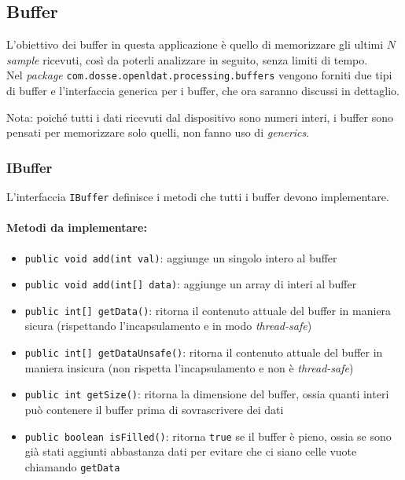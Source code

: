 \subsection{Buffer}
L'obiettivo dei buffer in questa applicazione è quello di memorizzare gli ultimi $N$ \textit{sample} ricevuti, così da poterli analizzare in seguito, senza limiti di tempo.\\
Nel \textit{package} \texttt{com.dosse.openldat.processing.buffers} vengono forniti due tipi di buffer e l'interfaccia generica per i buffer, che ora saranno discussi in dettaglio.

Nota: poiché tutti i dati ricevuti dal dispositivo sono numeri interi, i buffer sono pensati per memorizzare solo quelli, non fanno uso di \textit{generics}.

\subsubsection{IBuffer}
L'interfaccia \texttt{IBuffer} definisce i metodi che tutti i buffer devono implementare.

\paragraph{Metodi da implementare:}\begin{itemize}
	\item \texttt{public void add(int val)}: aggiunge un singolo intero al buffer
	\item \texttt{public void add(int[] data)}: aggiunge un array di interi al buffer
	\item \texttt{public int[] getData()}: ritorna il contenuto attuale del buffer in maniera sicura (rispettando l'incapsulamento e in modo \textit{thread-safe})
	\item \texttt{public int[] getDataUnsafe()}: ritorna il contenuto attuale del buffer in maniera insicura (non rispetta l'incapsulamento e non è \textit{thread-safe})
	\item \texttt{public int getSize()}: ritorna la dimensione del buffer, ossia quanti interi può contenere il buffer prima di sovrascrivere dei dati
	\item \texttt{public boolean isFilled()}: ritorna \texttt{true} se il buffer è pieno, ossia se sono già stati aggiunti abbastanza dati per evitare che ci siano celle vuote chiamando \texttt{getData}
\end{itemize}

